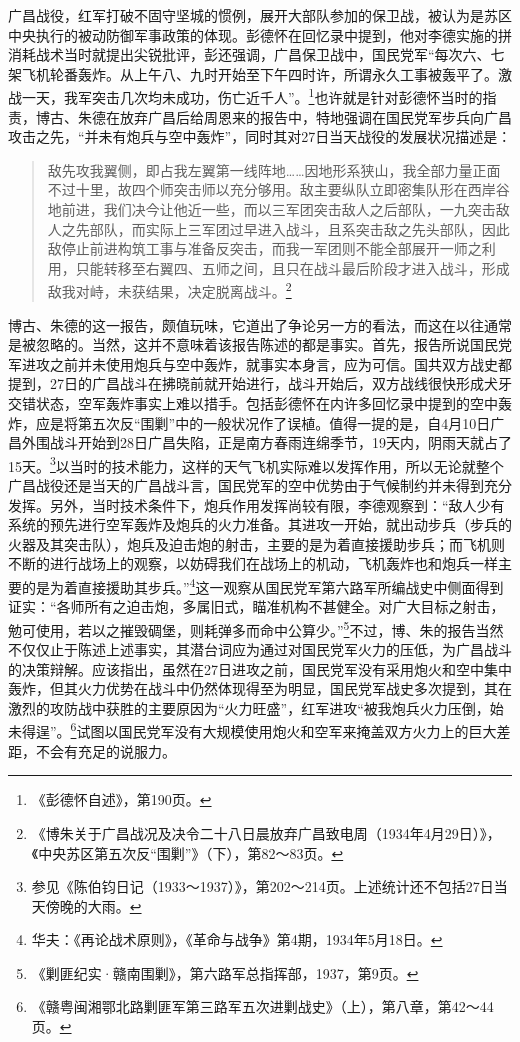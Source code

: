 广昌战役，红军打破不固守坚城的惯例，展开大部队参加的保卫战，被认为是苏区中央执行的被动防御军事政策的体现。彭德怀在回忆录中提到，他对李德实施的拼消耗战术当时就提出尖锐批评，彭还强调，广昌保卫战中，国民党军“每次六、七架飞机轮番轰炸。从上午八、九时开始至下午四时许，所谓永久工事被轰平了。激战一天，我军突击几次均未成功，伤亡近千人”。\footnote{《彭德怀自述》，第190页。}也许就是针对彭德怀当时的指责，博古、朱德在放弃广昌后给周恩来的报告中，特地强调在国民党军步兵向广昌攻击之先，“并未有炮兵与空中轰炸”，同时其对27日当天战役的发展状况描述是：

\begin{quote}

敌先攻我翼侧，即占我左翼第一线阵地……因地形系狭山，我全部力量正面不过十里，故四个师突击师以充分够用。敌主要纵队立即密集队形在西岸谷地前进，我们决今让他近一些，而以三军团突击敌人之后部队，一九突击敌人之先部队，而实际上三军团过早进入战斗，且系突击敌之先头部队，因此敌停止前进构筑工事与准备反突击，而我一军团则不能全部展开一师之利用，只能转移至右翼四、五师之间，且只在战斗最后阶段才进入战斗，形成敌我对峙，未获结果，决定脱离战斗。\footnote{《博朱关于广昌战况及决令二十八日晨放弃广昌致电周（1934年4月29日）》，《中央苏区第五次反“围剿”》（下），第82～83页。}
\end{quote}


博古、朱德的这一报告，颇值玩味，它道出了争论另一方的看法，而这在以往通常是被忽略的。当然，这并不意味着该报告陈述的都是事实。首先，报告所说国民党军进攻之前并未使用炮兵与空中轰炸，就事实本身言，应为可信。国共双方战史都提到，27日的广昌战斗在拂晓前就开始进行，战斗开始后，双方战线很快形成犬牙交错状态，空军轰炸事实上难以措手。包括彭德怀在内许多回忆录中提到的空中轰炸，应是将第五次反“围剿”中的一般状况作了误植。值得一提的是，自4月10日广昌外围战斗开始到28日广昌失陷，正是南方春雨连绵季节，19天内，阴雨天就占了15天。\footnote{参见《陈伯钧日记（1933～1937）》，第202～214页。上述统计还不包括27日当天傍晚的大雨。}以当时的技术能力，这样的天气飞机实际难以发挥作用，所以无论就整个广昌战役还是当天的广昌战斗言，国民党军的空中优势由于气候制约并未得到充分发挥。另外，当时技术条件下，炮兵作用发挥尚较有限，李德观察到：“敌人少有系统的预先进行空军轰炸及炮兵的火力准备。其进攻一开始，就出动步兵（步兵的火器及其突击队），炮兵及迫击炮的射击，主要的是为着直接援助步兵；而飞机则不断的进行战场上的观察，以妨碍我们在战场上的机动，飞机轰炸也和炮兵一样主要的是为着直接援助其步兵。”\footnote{华夫：《再论战术原则》，《革命与战争》第4期，1934年5月18日。}这一观察从国民党军第六路军所编战史中侧面得到证实：“各师所有之迫击炮，多属旧式，瞄准机构不甚健全。对广大目标之射击，勉可使用，若以之摧毁碉堡，则耗弹多而命中公算少。”\footnote{《剿匪纪实·赣南围剿》，第六路军总指挥部，1937，第9页。}不过，博、朱的报告当然不仅仅止于陈述上述事实，其潜台词应为通过对国民党军火力的压低，为广昌战斗的决策辩解。应该指出，虽然在27日进攻之前，国民党军没有采用炮火和空中集中轰炸，但其火力优势在战斗中仍然体现得至为明显，国民党军战史多次提到，其在激烈的攻防战中获胜的主要原因为“火力旺盛”，红军进攻“被我炮兵火力压倒，始未得逞”。\footnote{《赣粤闽湘鄂北路剿匪军第三路军五次进剿战史》（上），第八章，第42～44页。}试图以国民党军没有大规模使用炮火和空军来掩盖双方火力上的巨大差距，不会有充足的说服力。


